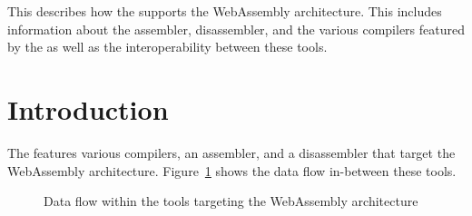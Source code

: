 




\renewcommand{\seewasm}{}

{This \documentation{} describes how the \ecs{} supports the WebAssembly architecture.
This includes information about the assembler, disassembler, and the various compilers featured by the \ecs{} as well as the interoperability between these tools.}

\section{Introduction}

The \ecs{} features various compilers, an assembler, and a disassembler that target the WebAssembly architecture.
Figure~\ref{fig:wasmdataflow} shows the data flow in-between these tools.

\begin{figure}
\caption{Data flow within the tools targeting the WebAssembly architecture}
\label{fig:wasmdataflow}
\end{figure}


